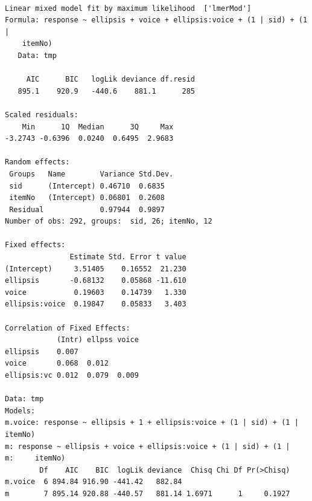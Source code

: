 \documentclass[11pt]{article}
\begin{document}
\begin{verbatim}

Linear mixed model fit by maximum likelihood  ['lmerMod']
Formula: response ~ ellipsis + voice + ellipsis:voice + (1 | sid) + (1 |  
    itemNo)
   Data: tmp

     AIC      BIC   logLik deviance df.resid 
   895.1    920.9   -440.6    881.1      285 

Scaled residuals: 
    Min      1Q  Median      3Q     Max 
-3.2743 -0.6396  0.0240  0.6495  2.9683 

Random effects:
 Groups   Name        Variance Std.Dev.
 sid      (Intercept) 0.46710  0.6835  
 itemNo   (Intercept) 0.06801  0.2608  
 Residual             0.97944  0.9897  
Number of obs: 292, groups:  sid, 26; itemNo, 12

Fixed effects:
               Estimate Std. Error t value
(Intercept)     3.51405    0.16552  21.230
ellipsis       -0.68132    0.05868 -11.610
voice           0.19603    0.14739   1.330
ellipsis:voice  0.19847    0.05833   3.403

Correlation of Fixed Effects:
            (Intr) ellpss voice
ellipsis    0.007              
voice       0.068  0.012       
ellipsis:vc 0.012  0.079  0.009

Data: tmp
Models:
m.voice: response ~ ellipsis + 1 + ellipsis:voice + (1 | sid) + (1 | itemNo)
m: response ~ ellipsis + voice + ellipsis:voice + (1 | sid) + (1 | 
m:     itemNo)
        Df    AIC    BIC  logLik deviance  Chisq Chi Df Pr(>Chisq)
m.voice  6 894.84 916.90 -441.42   882.84                         
m        7 895.14 920.88 -440.57   881.14 1.6971      1     0.1927
\end{verbatim}
\end{document}

